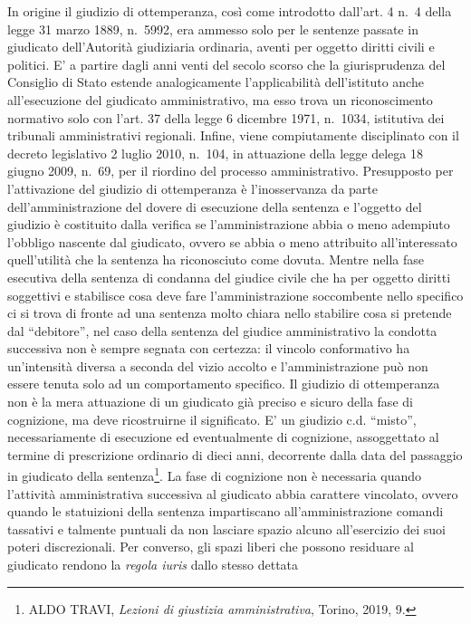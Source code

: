\documentclass[12pt,it,a4paper,]{report}
\begin{document}
In origine il giudizio di ottemperanza, così come introdotto dall'art. 4
n.~4 della legge 31 marzo 1889, n.~5992, era ammesso solo per le
sentenze passate in giudicato dell'Autorità giudiziaria ordinaria,
aventi per oggetto diritti civili e politici. E' a partire dagli anni
venti del secolo scorso che la giurisprudenza del Consiglio di Stato
estende analogicamente l'applicabilità dell'istituto anche
all'esecuzione del giudicato amministrativo, ma esso trova un
riconoscimento normativo solo con l'art. 37 della legge 6 dicembre 1971,
n.~1034, istitutiva dei tribunali amministrativi regionali. Infine,
viene compiutamente disciplinato con il decreto legislativo 2 luglio
2010, n.~104, in attuazione della legge delega 18 giugno 2009, n.~69,
per il riordino del processo amministrativo. Presupposto per
l'attivazione del giudizio di ottemperanza è l'inosservanza da parte
dell'amministrazione del dovere di esecuzione della sentenza e l'oggetto
del giudizio è costituito dalla verifica se l'amministrazione abbia o
meno adempiuto l'obbligo nascente dal giudicato, ovvero se abbia o meno
attribuito all'interessato quell'utilità che la sentenza ha riconosciuto
come dovuta. Mentre nella fase esecutiva della sentenza di condanna del
giudice civile che ha per oggetto diritti soggettivi e stabilisce cosa
deve fare l'amministrazione soccombente nello specifico ci si trova di
fronte ad una sentenza molto chiara nello stabilire cosa si pretende dal
``debitore'', nel caso della sentenza del giudice amministrativo la
condotta successiva non è sempre segnata con certezza: il vincolo
conformativo ha un'intensità diversa a seconda del vizio accolto e
l'amministrazione può non essere tenuta solo ad un comportamento
specifico. Il giudizio di ottemperanza non è la mera attuazione di un
giudicato già preciso e sicuro della fase di cognizione, ma deve
ricostruirne il significato. E' un giudizio c.d. ``misto'',
necessariamente di esecuzione ed eventualmente di cognizione,
assoggettato al termine di prescrizione ordinario di dieci anni,
decorrente dalla data del passaggio in giudicato della
sentenza\footnote{ALDO TRAVI, \emph{Lezioni di giustizia
  amministrativa}, Torino, 2019, 9.}. La fase di cognizione non è
necessaria quando l'attività amministrativa successiva al giudicato
abbia carattere vincolato, ovvero quando le statuizioni della sentenza
impartiscano all'amministrazione comandi tassativi e talmente puntuali
da non lasciare spazio alcuno all'esercizio dei suoi poteri
discrezionali. Per converso, gli spazi liberi che possono residuare al
giudicato rendono la \emph{regola iuris} dallo stesso dettata
\end{document}
